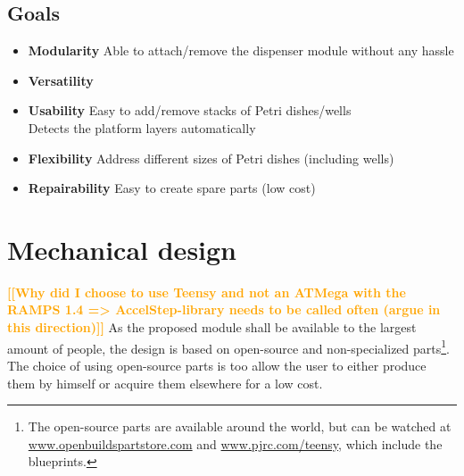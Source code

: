 \documentclass{sigchi}
\newcommand{\todo}[1]{\textsf{\textbf{\textcolor{Orange}{[[#1]]}}}}
\begin{document}
	\subsection{Goals}
	
	
	\begin{itemize}
		\item \textbf{Modularity} Able to attach/remove the dispenser module without any hassle
		\item \textbf{Versatility }
		\item \textbf{Usability} 	Easy to add/remove stacks of Petri dishes/wells\\
		Detects the platform layers automatically\\
		\item \textbf{Flexibility} Address different sizes of Petri dishes (including wells)
		\item \textbf{Repairability} Easy to create spare parts (low cost)
		
			
	\end{itemize}
	
	
	\section{Mechanical design}
	
	\todo{Why did I choose to use Teensy and not an ATMega with the RAMPS 1.4 => AccelStep-library needs to be called often (argue in this direction)}
	As the proposed module shall be available to the largest amount of people, the design is based on open-source and non-specialized parts\footnote{The open-source parts are available around the world, but can be watched at \url{www.openbuildspartstore.com} and \url{www.pjrc.com/teensy}, which include the blueprints.}. The choice of using open-source parts is too allow the user to either produce them by himself or acquire them elsewhere for a low cost. 
	
\end{document}
